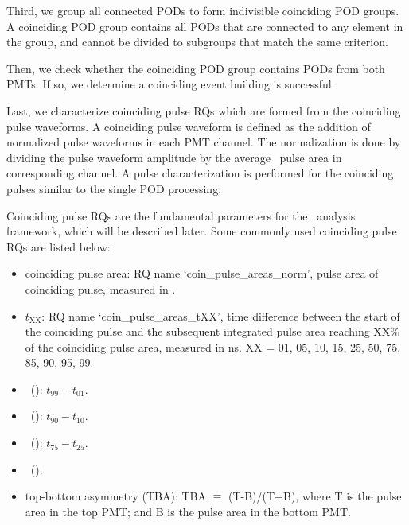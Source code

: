 Third, we group all connected PODs to form indivisible coinciding POD groups. A coinciding POD group contains all PODs that are connected to any element in the group, and cannot be divided to subgroups that match the same criterion. 

Then, we check whether the coinciding POD group contains PODs from both PMTs. If so, we determine a coinciding event building is successful.

Last, we characterize coinciding pulse RQs which are formed from the coinciding pulse waveforms. A coinciding pulse waveform is defined as the addition of normalized pulse waveforms in each PMT channel. The normalization is done by dividing the pulse waveform amplitude by the average \sphe\ pulse area in corresponding channel. A pulse characterization is performed for the coinciding pulses similar to the single POD processing.    

Coinciding pulse RQs are the fundamental parameters for the \ees\ analysis framework, which will be described later. Some commonly used coinciding pulse RQs are listed below: 
\begin{itemize}
\item coinciding pulse area: RQ name `coin\_pulse\_areas\_norm', pulse area of coinciding pulse, measured in \si{\phe}.
\item $t_{\text{XX}}$: RQ name `coin\_pulse\_areas\_tXX', time difference between the start of the coinciding pulse and the subsequent integrated pulse area reaching XX\% of the coinciding pulse area, measured in \si{ns}. XX = 01, 05, 10, 15, 25, 50, 75, 85, 90, 95, 99.
\item \pud\  (\tzeronine ): $t_{99}-t_{01}$.
\item \rpd\ (\ttenninety ): $t_{90}-t_{10}$.
\item \stw\ (\ttwoseven ): $t_{75}-t_{25}$.
\item \shw\ (\tfifty ).
\item top-bottom asymmetry (TBA): TBA $\equiv$ (T-B)/(T+B),  where T is the pulse area in the top PMT; and B is the pulse area in the bottom PMT. 
\end{itemize}

